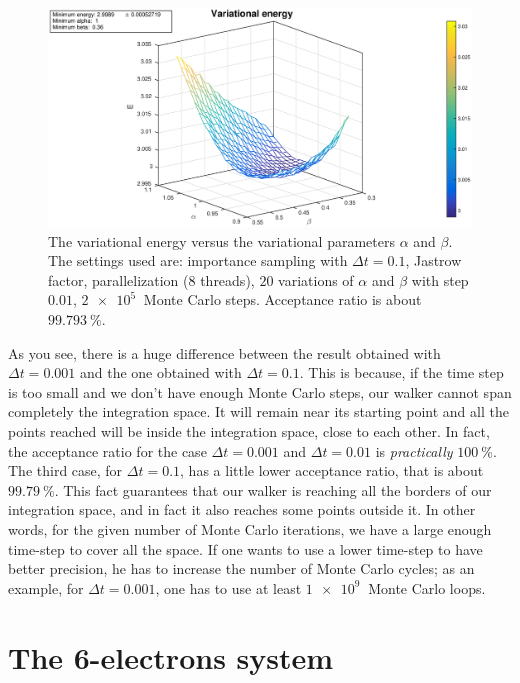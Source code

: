 \documentclass[a4paper,twoside,11pt]{book}
\begin{document}
\begin{figure}%
	\centering
	\includegraphics[width=\textwidth]{2e-rep_imp_high}
	\caption{The variational energy versus the variational parameters $\alpha$ and $\beta$. The settings used are: importance sampling with $\Delta t = 0.1$, Jastrow factor, parallelization (8 threads), $20$ variations of $\alpha$ and $\beta$ with step $0.01$, $\SI{2e5}{}$ Monte Carlo steps. Acceptance ratio is about $\SI{99.793}{\percent}$.}
	\label{fig:2e-rep_imp_high}
\end{figure}

As you see, there is a huge difference between the result obtained with $\Delta t = 0.001$ and the one obtained with $\Delta t = 0.1$. This is because, if the time step is too small and we don't have enough Monte Carlo steps, our walker cannot span completely the integration space. It will remain near its starting point and all the points reached will be inside the integration space, close to each other. In fact, the acceptance ratio for the case $\Delta t = 0.001$ and $\Delta t = 0.01$ is \emph{practically} $\SI{100}{\percent}$. The third case, for $\Delta t = 0.1$, has a little lower acceptance ratio, that is about $\SI{99.79}{\percent}$. This fact guarantees that our walker is reaching all the borders of our integration space, and in fact it also reaches some points outside it. In other words, for the given number of Monte Carlo iterations, we have a large enough time-step to cover all the space. If one wants to use a lower time-step to have better precision, he has to increase the number of Monte Carlo cycles; as an example, for $\Delta t = 0.001$, one has to use at least $\SI{1e9}{}$ Monte Carlo loops.


\chapter{The 6-electrons system}
\end{document}
